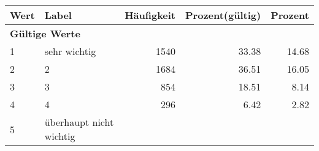      \begin{longtable}{lXrrr}
     \toprule
     \textbf{Wert} & \textbf{Label} & \textbf{Häufigkeit} & \textbf{Prozent(gültig)} & \textbf{Prozent} \\
     \endhead
     \midrule
     \multicolumn{5}{l}{\textbf{Gültige Werte}}\\

     1 &
     \multicolumn{1}{X}{ sehr wichtig   } &


       \num{1540} &
       \num[round-mode=places,round-precision=2]{33,38} &
         \num[round-mode=places,round-precision=2]{14,68} \\

     2 &
     \multicolumn{1}{X}{ 2   } &


       \num{1684} &
       \num[round-mode=places,round-precision=2]{36,51} &
         \num[round-mode=places,round-precision=2]{16,05} \\

     3 &
     \multicolumn{1}{X}{ 3   } &


       \num{854} &
       \num[round-mode=places,round-precision=2]{18,51} &
         \num[round-mode=places,round-precision=2]{8,14} \\

     4 &
     \multicolumn{1}{X}{ 4   } &


       \num{296} &
       \num[round-mode=places,round-precision=2]{6,42} &
         \num[round-mode=places,round-precision=2]{2,82} \\

     5 &
     \multicolumn{1}{X}{ überhaupt nicht wichtig   } &



\end{longtable}
